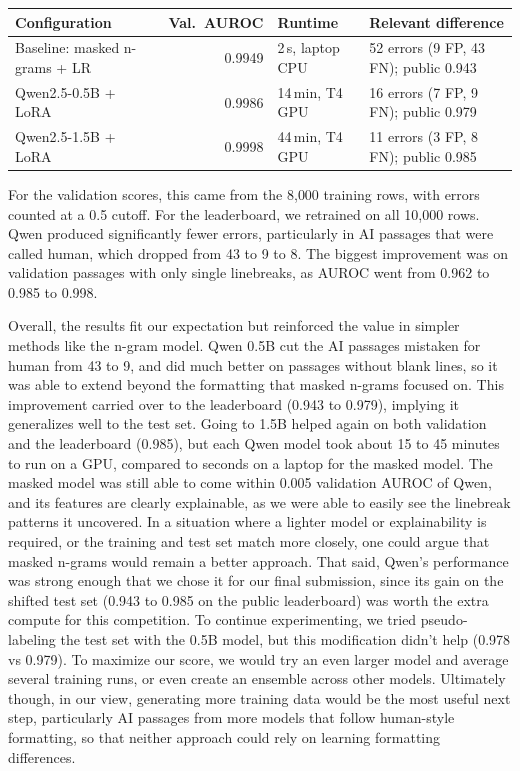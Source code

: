 \begin{tabularx}{\linewidth}{@{}p{1.6in}rp{0.95in}Y@{}}\toprule Configuration & Val.\ AUROC & Runtime & Relevant difference \\ \midrule
Baseline: masked n-grams + LR & 0.9949 & 2\,s, laptop CPU & 52 errors (9 FP, 43 FN); public 0.943 \\
Qwen2.5-0.5B + LoRA & 0.9986 & 14\,min, T4 GPU & 16 errors (7 FP, 9 FN); public 0.979 \\
Qwen2.5-1.5B + LoRA & 0.9998 & 44\,min, T4 GPU & 11 errors (3 FP, 8 FN); public 0.985 \\
\bottomrule\end{tabularx}
\par\noindent
For the validation scores, this came from the 8{,}000 training rows, with errors counted at a 0.5 cutoff. For the leaderboard, we retrained on all 10{,}000 rows.
Qwen produced significantly fewer errors, particularly in AI passages that were called human, which dropped from 43 to 9 to 8.
The biggest improvement was on validation passages with only single linebreaks, as AUROC went from 0.962 to 0.985 to 0.998.

Overall, the results fit our expectation but reinforced the value in simpler methods like the n-gram model.
Qwen 0.5B cut the AI passages mistaken for human from 43 to 9, and did much better on passages without blank lines, so it was able to extend beyond the formatting that masked n-grams focused on.
This improvement carried over to the leaderboard (0.943 to 0.979), implying it generalizes well to the test set.
Going to 1.5B helped again on both validation and the leaderboard (0.985), but each Qwen model took about 15 to 45 minutes to run on a GPU, compared to seconds on a laptop for the masked model.
The masked model was still able to come within 0.005 validation AUROC of Qwen, and its features are clearly explainable, as we were able to easily see the linebreak patterns it uncovered.
In a situation where a lighter model or explainability is required, or the training and test set match more closely, one could argue that masked n-grams would remain a better approach.
That said, Qwen's performance was strong enough that we chose it for our final submission, since its gain on the shifted test set (0.943 to 0.985 on the public leaderboard) was worth the extra compute for this competition.
To continue experimenting, we tried pseudo-labeling the test set with the 0.5B model, but this modification didn't help (0.978 vs 0.979).
To maximize our score, we would try an even larger model and average several training runs, or even create an ensemble across other models.
Ultimately though, in our view, generating more training data would be the most useful next step, particularly AI passages from more models that follow human-style formatting, so that neither approach could rely on learning formatting differences.
